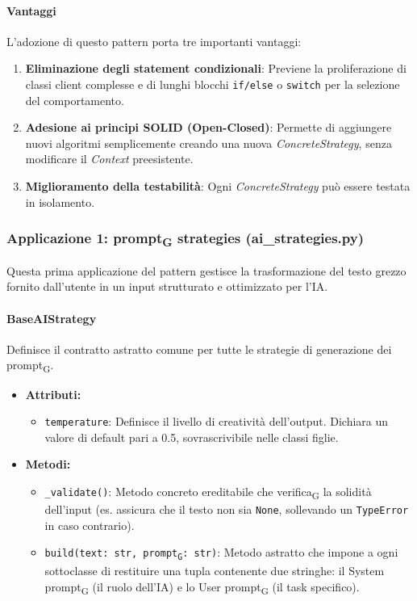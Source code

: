 \documentclass[11pt,a4paper]{article}
\newcommand{\gls}[1]{#1\textsubscript{G}}
\begin{document}
\paragraph{Vantaggi}
L'adozione di questo pattern porta tre importanti vantaggi:
\begin{enumerate}
    \item \textbf{Eliminazione degli statement condizionali}: Previene la proliferazione di classi client complesse e di lunghi blocchi \texttt{if/else} o \texttt{switch} per la selezione del comportamento.
    \item \textbf{Adesione ai principi SOLID (Open-Closed)}: Permette di aggiungere nuovi algoritmi semplicemente creando una nuova \textit{ConcreteStrategy}, senza modificare il \textit{Context} preesistente.
    \item \textbf{Miglioramento della testabilità}: Ogni \textit{ConcreteStrategy} può essere testata in isolamento.
\end{enumerate}

\subsubsection{Applicazione 1: \gls{prompt} strategies (ai\_strategies.py)}
Questa prima applicazione del pattern gestisce la trasformazione del testo grezzo fornito dall'utente in un input strutturato e ottimizzato per l'IA.

\paragraph{BaseAIStrategy}
Definisce il contratto astratto comune per tutte le strategie di generazione dei \gls{prompt}.
\begin{itemize}
    \item\textbf{Attributi:}
\begin{itemize}
    \item \texttt{temperature}: Definisce il livello di creatività dell'output. Dichiara un valore di default pari a 0.5, sovrascrivibile nelle classi figlie.
\end{itemize}
    \item \textbf{Metodi:}
\begin{itemize}
    \item \texttt{\_validate()}: Metodo concreto ereditabile che \gls{verifica} la solidità dell'input (es. assicura che il testo non sia \texttt{None}, sollevando un \texttt{TypeError} in caso contrario).
    \item \texttt{build(text: str, \gls{prompt}: str)}: Metodo astratto che impone a ogni sottoclasse di restituire una tupla contenente due stringhe: il \gls{System prompt} (il ruolo dell'IA) e lo \gls{User prompt} (il task specifico).
\end{itemize}
\end{itemize}
\end{document}
